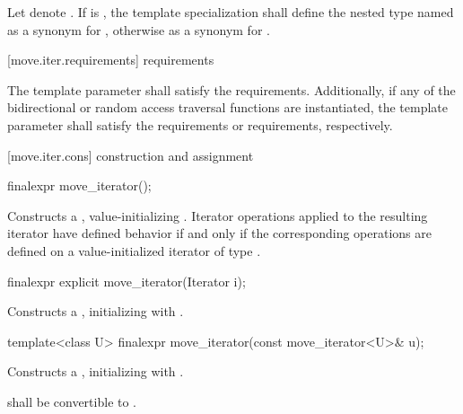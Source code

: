 \pnum
Let  denote .
If  is ,
the template specialization  shall define
the nested type named  as a synonym for
,
otherwise as a synonym for .

[move.iter.requirements]{ requirements}

\pnum
The template parameter  shall satisfy
the  requirements.
Additionally, if any of the bidirectional or random access traversal
functions are instantiated, the template parameter shall satisfy the
 requirements
or  requirements, respectively.

[move.iter.cons]{ construction and assignment}

%
\begin{itemdecl}
finalexpr move_iterator();
\end{itemdecl}

\begin{itemdescr}
\pnum
\effects Constructs a , value-initializing
. Iterator operations applied to the resulting
iterator have defined behavior if and only if the corresponding operations are defined
on a value-initialized iterator of type .
\end{itemdescr}


%
\begin{itemdecl}
finalexpr explicit move_iterator(Iterator i);
\end{itemdecl}

\begin{itemdescr}
\pnum
\effects Constructs a , initializing
 with .
\end{itemdescr}


%
\begin{itemdecl}
template<class U> finalexpr move_iterator(const move_iterator<U>& u);
\end{itemdecl}

\begin{itemdescr}
\pnum
\effects Constructs a , initializing
 with .

\pnum
\requires {} shall be convertible to
.
\end{itemdescr}

